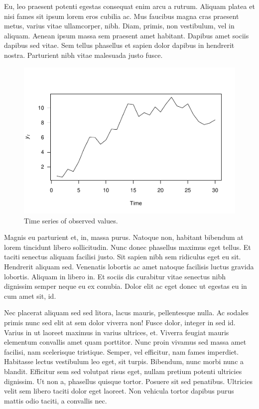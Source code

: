 \documentclass[11pt,]{report}
\begin{document}
Eu, leo praesent potenti egestas consequat enim arcu a rutrum. Aliquam
platea et nisi fames sit ipsum lorem eros cubilia ac. Mus faucibus magna
cras praesent metus, varius vitae ullamcorper, nibh. Diam, primis, non
vestibulum, vel in aliquam. Aenean ipsum massa sem praesent amet
habitant. Dapibus amet sociis dapibus sed vitae. Sem tellus phasellus et
sapien dolor dapibus in hendrerit nostra. Parturient nibh vitae
malesuada justo fusce.

\vspace{0.5in}

\begin{figure}
\centering
\includegraphics{six_files/figure-latex/random_walk-1.pdf}
\caption{Time series of observed values.}
\end{figure}

Magnis eu parturient et, in, massa purus. Natoque non, habitant bibendum
at lorem tincidunt libero sollicitudin. Nunc donec phasellus maximus
eget tellus. Et taciti senectus aliquam facilisi justo. Sit sapien nibh
sem ridiculus eget eu sit. Hendrerit aliquam sed. Venenatis lobortis ac
amet natoque facilisis luctus gravida lobortis. Aliquam in libero in. Et
sociis dis curabitur vitae senectus nibh dignissim semper neque eu ex
conubia. Dolor elit ac eget donec ut egestas eu in cum amet sit, id.

Nec placerat aliquam sed sed litora, lacus mauris, pellentesque nulla.
Ac sodales primis nunc sed elit at sem dolor viverra non! Fusce dolor,
integer in sed id. Varius in ut laoreet maximus in varius ultrices, et.
Viverra feugiat mauris elementum convallis amet quam porttitor. Nunc
proin vivamus sed massa amet facilisi, nam scelerisque tristique.
Semper, vel efficitur, nam fames imperdiet. Habitasse lectus vestibulum
leo eget, sit turpis. Bibendum, nunc morbi nunc a blandit. Efficitur sem
sed volutpat risus eget, nullam pretium potenti ultricies dignissim. Ut
non a, phasellus quisque tortor. Posuere sit sed penatibus. Ultricies
velit sem libero taciti dolor eget laoreet. Non vehicula tortor dapibus
purus mattis odio taciti, a convallis nec.
\end{document}
